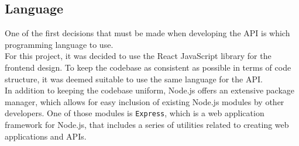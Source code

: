 \subsection{Language}
One of the first decisions that must be made when developing the API is which programming language to use.\\
For this project, it was decided to use the React JavaScript library for the frontend design.
To keep the codebase as consistent as possible in terms of code structure, it was deemed suitable to use the same language for the API.\\
In addition to keeping the codebase uniform, Node.js offers an extensive package manager, which allows for easy inclusion of existing Node.js modules by other developers.
One of those modules is \texttt{Express}, which is a web application framework for Node.js, that includes a series of utilities related to creating web applications and APIs.

